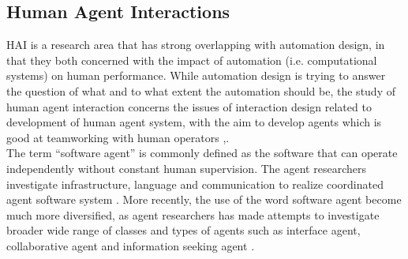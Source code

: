 
\subsection{Human Agent Interactions}\label{sec:LRHAI}
\acf{HAI} is a research area that has strong overlapping with automation design, in that they both concerned with the impact of automation (i.e. computational systems) on human performance. While automation design is trying to answer the question of what and to what extent the automation should be, the study of human agent interaction concerns the issues of interaction design related to development of human agent system, with the aim to develop agents which is good at teamworking with human operators \cite{Bradshaw2011},\cite{Sukthankara}. \\

The term ``software agent'' is commonly defined as the software that can operate independently without constant human supervision\cite{Vlassis2007}. The agent researchers investigate infrastructure, language and communication to realize coordinated agent software system \cite{Nwana1996}. More recently, the use of the word software agent become much more diversified, as agent researchers has made attempts to investigate broader wide range of classes and types of agents such as interface agent, collaborative agent and information seeking agent \cite{Nwana1996}.  \\

